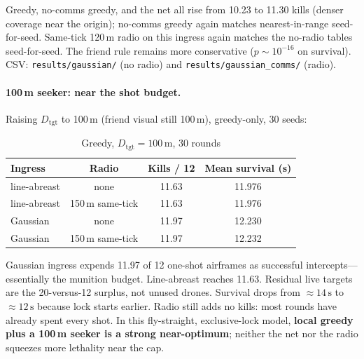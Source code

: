 \documentclass[12pt,a4paper]{article}
\begin{document}
Greedy, no-comms greedy, and the net all rise from 10.23 to 11.30 kills (denser coverage near the origin); no-comms greedy again matches nearest-in-range seed-for-seed. Same-tick 120\,m radio on this ingress again matches the no-radio tables seed-for-seed. The friend rule remains more conservative ($p\sim 10^{-16}$ on survival). CSV: \texttt{results/gaussian/} (no radio) and \texttt{results/gaussian\_comms/} (radio).

\paragraph{100\,m seeker: near the shot budget.}
Raising $D_{\mathrm{tgt}}$ to 100\,m (friend visual still 100\,m), greedy-only, 30 seeds:

\begin{table}[H]
\centering
\caption{Greedy, $D_{\mathrm{tgt}}=100\,\mathrm{m}$, 30 rounds}
\label{tab:d100}
\begin{tabular}{lccc}
\toprule
Ingress & Radio & Kills / 12 & Mean survival (s) \\
\midrule
line-abreast & none & 11.63 & 11.976 \\
line-abreast & 150\,m same-tick & 11.63 & 11.976 \\
Gaussian & none & 11.97 & 12.230 \\
Gaussian & 150\,m same-tick & 11.97 & 12.232 \\
\bottomrule
\end{tabular}
\end{table}

Gaussian ingress expends 11.97 of 12 one-shot airframes as successful intercepts---essentially the munition budget. Line-abreast reaches 11.63. Residual live targets are the 20-versus-12 surplus, not unused drones. Survival drops from $\approx 14\,\mathrm{s}$ to $\approx 12\,\mathrm{s}$ because lock starts earlier. Radio still adds no kills: most rounds have already spent every shot. In this fly-straight, exclusive-lock model, \textbf{local greedy plus a 100\,m seeker is a strong near-optimum}; neither the net nor the radio squeezes more lethality near the cap.
\end{document}

